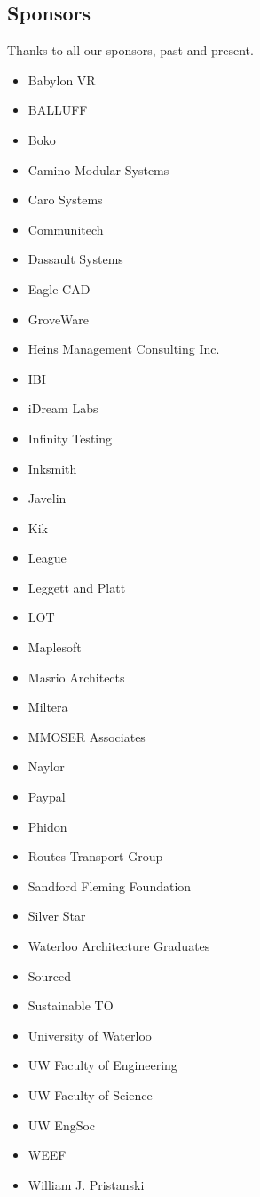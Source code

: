 \documentclass[main.tex]{subfiles}
\begin{document}
\subsection{Sponsors}
Thanks to all our sponsors, past and present.
\begin{multicols}{3}
    \begin{itemize}[label={},noitemsep]
    \item {Babylon VR}
    \item {BALLUFF}
    \item {Boko}
    \item {Camino Modular Systems}
    \item {Caro Systems}
    \item {Communitech}
    \item {Dassault Systems}
    \item {Eagle CAD}
    \item {GroveWare}
    \item {Heins Management Consulting Inc.}
    \item {IBI}
    \item {iDream Labs}
    \item {Infinity Testing}
    \item {Inksmith}
    \item {Javelin}
    \item {Kik}
    \item {League}
    \item {Leggett and Platt}
    \item {LOT}
    \item {Maplesoft}
    \item {Masrio Architects}
    \item {Miltera}
    \item {MMOSER Associates}
    \item {Naylor}
    \item {Paypal}
    \item {Phidon}
    \item {Routes Transport Group}
    \item {Sandford Fleming Foundation}
    \item {Silver Star}
    \item {Waterloo Architecture Graduates}
    \item {Sourced}
    \item {Sustainable TO}
    \item {University of Waterloo}
    \item {UW Faculty of Engineering}
    \item {UW Faculty of Science}
    \item {UW EngSoc}
    \item {WEEF}
    \item {William J. Pristanski}
    \end{itemize}
\end{multicols}
\end{document}
